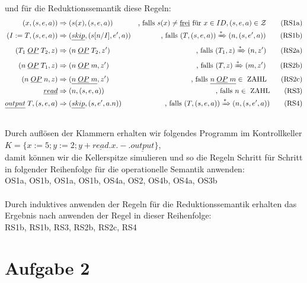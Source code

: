 \documentclass[ngerman,a4paper]{report}
\begin{document}
und für die Reduktionssemantik diese Regeln:
\begin{align}
(x,(s,e,a)) &\Rightarrow (s(x), (s,e,a))&\text{, falls }s(x) \neq \text{\underline{frei}}\text{ für }x \in ID, (s,e,a) \in \mathcal{Z}\tag{RS1a}\\
(I:=T,(s,e,a)) &\Rightarrow (\underline{skip}, (s[n/I],e',a))&\text{, falls }(T, (s,e,a))\xRightarrow{*}(n,(s,e',a))\tag{RS1b}\\
(T_1\;\underline{OP}\;T_2, z) &\Rightarrow (n\;\underline{OP}\;T_2, z')&\text{, falls }(T_1, z) \xRightarrow{*}(n,z')\tag{RS2a}\\
(n\;\underline{OP}\;T_1, z) &\Rightarrow (n\;\underline{OP}\;m, z')&\text{, falls }(T, z) \xRightarrow{*}(m,z')\tag{RS2b}\\
(n\;\underline{OP}\;n, z) &\Rightarrow (\underline{n\;\underline{OP}\;m}, z')&\text{, falls }\underline{n\;\underline{OP}\;m} \in\text{ ZAHL}\tag{RS2c}\\
\underline{read} &\Rightarrow (n, (s,e,a))&\text{, falls } n \in\text{ ZAHL}\tag{RS3}\\
\underline{output}\;T, (s,e,a) &\Rightarrow (\underline{skip}, (s,e',a.n))&\text{, falls }(T, (s,e,a))\xRightarrow{*}(n,(s,e',a))\tag{RS4}\\\notag
\end{align}
Durch auflösen der Klammern erhalten wir folgendes Programm im Kontrollkeller\\
$K= \{x := 5; y := 2; y + \underline{read}.x.-.\underline{output}\}$,\\ damit können wir die Kellerspitze simulieren und so die Regeln Schritt für Schritt in folgender Reihenfolge für die operationelle Semantik anwenden:\\
OS1a, OS1b, OS1a, OS1b, OS4a, OS2, OS4b, OS4a, OS3b\\
\\
Durch induktives anwenden der Regeln für die Reduktionssemantik erhalten das Ergebnis nach anwenden der Regel in dieser Reihenfolge:\\
RS1b, RS1b, RS3, RS2b, RS2c, RS4\\

\section*{Aufgabe 2}
\end{document}
